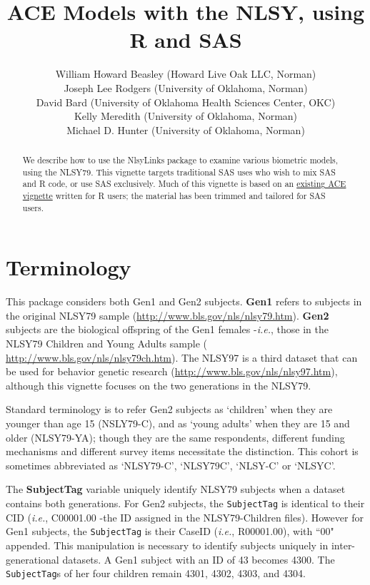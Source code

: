 \documentclass[letterpaper]{article}\usepackage{graphicx, color}
\title{ACE Models with the NLSY, using R and SAS}
\author{William Howard Beasley (Howard Live Oak LLC, Norman)\\
Joseph Lee Rodgers (University of Oklahoma, Norman)\\
David Bard (University of Oklahoma Health Sciences Center, OKC)\\
Kelly Meredith (University of Oklahoma, Norman)\\
Michael D. Hunter (University of Oklahoma, Norman)
}
\begin{document}
\newcommand{\code}[1]{\texttt{\small{#1}}}
\newcommand{\pkg}[1]{\textsf{\small{#1}}}
\newcommand{\R}{\textsf{R}} %

\maketitle

\begin{abstract}
   We describe how to use the \pkg{NlsyLinks} package to examine various biometric models, using the NLSY79.  This vignette targets traditional SAS uses who wish to mix SAS and \R{} code, or use SAS exclusively.  Much of this vignette is based on an \hyperref[http://cran.r-project.org/web/packages/NlsyLinks/vignettes/NlsyAce.pdf]{existing ACE vignette} written for \R{} users; the material has been trimmed and tailored for SAS users.
\end{abstract}  
\tableofcontents




\section{Terminology} %
This package considers both Gen1 and Gen2 subjects.  \textbf{Gen1} refers to subjects in the original NLSY79 sample (\url{http://www.bls.gov/nls/nlsy79.htm}).  \textbf{Gen2} subjects are the biological offspring of the Gen1 females -\emph{i.e.}, those in the NLSY79 Children and Young Adults sample ( \url{http://www.bls.gov/nls/nlsy79ch.htm}).  The NLSY97 is a third dataset that can be used for behavior genetic research (\url{http://www.bls.gov/nls/nlsy97.htm}), although this vignette focuses on the two generations in the NLSY79.

Standard terminology is to refer Gen2 subjects as `children' when they are younger than age 15 (NSLY79-C), and as `young adults' when they are 15 and older (NLSY79-YA); though they are the same respondents, different funding mechanisms and different survey items necessitate the distinction.  This cohort is sometimes abbreviated as `NLSY79-C', `NLSY79C', `NLSY-C' or `NLSYC'. 

The \textbf{SubjectTag}\label{term:SubjectTag} variable uniquely identify NLSY79 subjects when a dataset contains both generations.  For Gen2 subjects, the \code{SubjectTag} is identical to their CID (\emph{i.e.}, C00001.00 -the ID assigned in the NLSY79-Children files).  However for Gen1 subjects, the \code{SubjectTag} is their CaseID (\emph{i.e.}, R00001.00), with ``00" appended.  This manipulation is necessary to identify subjects uniquely in inter-generational datasets.  A Gen1 subject with an ID of 43 becomes 4300.  The \code{SubjectTag}s of her four children remain 4301, 4302, 4303, and 4304.
\end{document}
